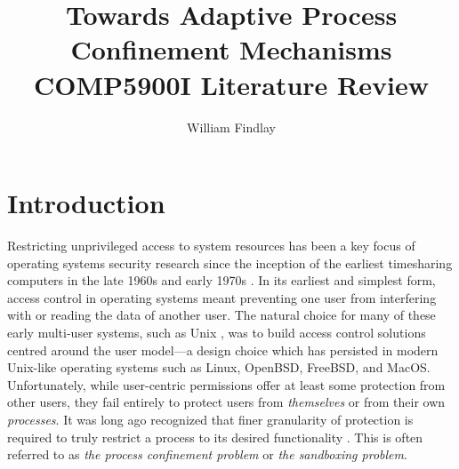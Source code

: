 \documentclass[dvipsnames, 12pt]{article}
\title{\huge Towards Adaptive Process Confinement
Mechanisms\\{\large COMP5900I Literature Review}}
\author{William Findlay}
\begin{document}
\maketitle
\thispagestyle{empty}


\vfill
\begin{abstract}
\end{abstract}
\vfill
\vfill

\clearpage

\setcounter{page}{1}


\section{Introduction}
\label{sec:introduction}

Restricting unprivileged access to system resources has been a key focus of
operating systems security research since the inception of the earliest
timesharing computers in the late 1960s and early 1970s
\cite{graham1968_protection, ritchie1973_unix, corbato1962_ctss}. In its
earliest and simplest form, access control in operating systems meant preventing
one user from interfering with or reading the data of another user. The natural
choice for many of these early multi-user systems, such as Unix
\cite{ritchie1973_unix}, was to build access control solutions centred around
the user model---a design choice which has persisted in modern Unix-like
operating systems such as Linux, OpenBSD, FreeBSD, and MacOS.  Unfortunately,
while user-centric permissions offer at least some protection from other users,
they fail entirely to protect users from \textit{themselves} or from their own
\textit{processes}.  It was long ago recognized that finer granularity of
protection is required to truly restrict a process to its desired functionality
\cite{lampson1973_a_note}. This is often referred to as \textit{the process
confinement problem} or \textit{the sandboxing problem}.
\end{document}
